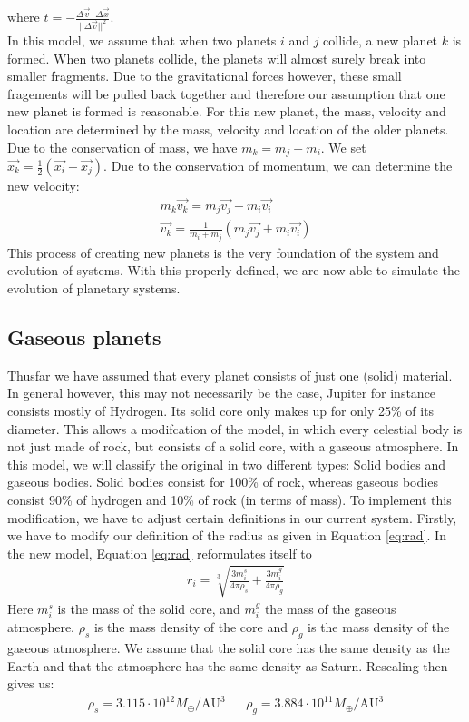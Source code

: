 where \(t= -\frac{\Delta\vec{v}\cdot \Delta\vec{x}}{||\Delta \vec{v}||^2}\).\\
In this model, we assume that when two planets \(i\) and \(j\) collide, a new planet \(k\) is formed. When two planets collide, the planets will almost surely break into smaller fragments. 
Due to the gravitational forces however, these small fragements will be pulled back together and therefore our assumption that one new planet is formed is reasonable.
For this new planet, the mass, velocity and location are determined by the mass, velocity and location of the older planets. 
Due to the conservation of mass, we have \(m_k=m_j+m_i\). We set \(\vec{x_k}=\frac{1}{2}(\vec{x_i}+\vec{x_j})\). Due to the conservation of momentum, we can determine the new velocity: 
\begin{align*}
	m_k\vec{v_k}=m_j\vec{v_j}+m_i\vec{v_i}\\
	\vec{v_k}=\frac{1}{m_i+m_j}(m_j\vec{v_j}+m_i\vec{v_i})
\end{align*}
This process of creating new planets is the very foundation of the system and evolution of systems. With this properly defined, we are now able to simulate the evolution of planetary systems.
\subsection{Gaseous planets}
Thusfar we have assumed that every planet consists of just one (solid) material. 
In general however, this may not necessarily be the case, Jupiter for instance consists mostly of Hydrogen. Its solid core only makes up for only 25\% of its diameter.
This allows a modifcation of the model, in which every celestial body is not just made of rock, but consists of a solid core, with a gaseous atmosphere. 
In this model, we will classify the original in two different types: Solid bodies and gaseous bodies.
 Solid bodies consist for 100\% of rock, whereas gaseous bodies consist 90\% of hydrogen and 10\% of rock (in terms of mass). To implement this modification, we have to adjust certain definitions in our current system. Firstly, we have to modify our definition of the radius as given in Equation \eqref{eq:rad}. In the new model, Equation \eqref{eq:rad} reformulates itself to
 \begin{align*}
 r_i=\sqrt[3]{\frac{3 m_i^s}{4\pi \rho_s}+\frac{3 m_i^g}{4\pi \rho_g}}
 \end{align*}
 Here \(m_i^s\) is the mass of the solid core, and \(m_i^g\) the mass of the gaseous atmosphere. \(\rho_s\) is the mass density of the core and \(\rho_g\) is the mass density of the gaseous atmosphere. We assume that the solid core has the same density as the Earth and that the atmosphere has the same density as Saturn. Rescaling then gives us:
 \begin{align*}
 \rho_s =3.115\cdot 10^{12}{M_{\oplus}}/{\text{AU}^3} && \rho_g = 3.884\cdot 10^{11}{M_{\oplus}}/{\text{AU}^3}
 \end{align*}
